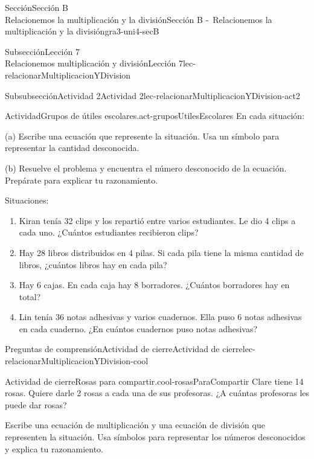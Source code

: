 \begin{sectionptx}{Sección}{{\Large Sección B\\}Relacionemos la multiplicación y la división}{}{Sección B -~Relacionemos la multiplicación y la división}{}{}{gra3-uni4-secB}
\begin{subsectionptx}{Subsección}{{\normalsize Lección 7\\[-0.05cm]}Relacionemos multiplicación y división}{}{Lección 7}{}{}{lec-relacionarMultiplicacionYDivision}
\begin{subsubsectionptx}{Subsubsección}{Actividad 2}{}{Actividad 2}{}{}{lec-relacionarMultiplicacionYDivision-act2}
\begin{activity}{Actividad}{Grupos de útiles escolares.}{act-gruposUtilesEscolares}%
En cada situación:%
\par
(a) Escribe una ecuación que represente la situación. Usa un símbolo para representar la cantidad desconocida.%
\par
(b) Resuelve el problema y encuentra el número desconocido de la ecuación. Prepárate para explicar tu razonamiento.%
\par
Situaciones:%
%
\begin{enumerate}
\item{}Kiran tenía 32 clips y los repartió entre varios estudiantes. Le dio 4 clips a cada uno. ¿Cuántos estudiantes recibieron clips?%
\item{}Hay 28 libros distribuidos en 4 pilas. Si cada pila tiene la misma cantidad de libros, ¿cuántos libros hay en cada pila?%
\item{}Hay 6 cajas. En cada caja hay 8 borradores. ¿Cuántos borradores hay en total?%
\item{}Lin tenía 36 notas adhesivas y varios cuadernos. Ella puso 6 notas adhesivas en cada cuaderno. ¿En cuántos cuadernos puso notas adhesivas?%
\end{enumerate}
\end{activity}%
\end{subsubsectionptx}
%
%
\typeout{************************************************}
\typeout{************************************************}
%
\begin{reading-questions-subsubsection}{Preguntas de comprensión}{Actividad de cierre}{}{Actividad de cierre}{}{}{lec-relacionarMultiplicacionYDivision-cool}
\begin{project}{Actividad de cierre}{Rosas para compartir.}{cool-rosasParaCompartir}%
Clare tiene 14 rosas. Quiere darle 2 rosas a cada una de sus profesoras. ¿A cuántas profesoras les puede dar rosas?%
\par
Escribe una ecuación de multiplicación y una ecuación de división que representen la situación. Usa símbolos para representar los números desconocidos y explica tu razonamiento.%
\end{project}%
\end{reading-questions-subsubsection}
\end{subsectionptx}
%
%
\typeout{************************************************}
\typeout{************************************************}

\end{sectionptx}
